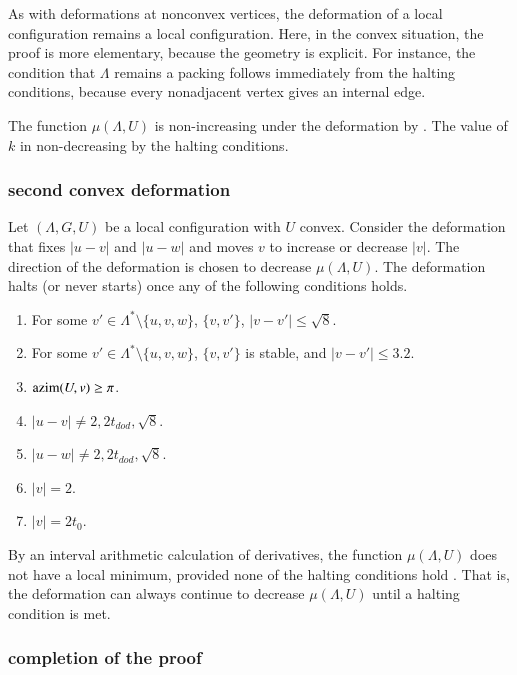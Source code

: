 \documentclass{article} %
\begin{document}
As with deformations at nonconvex vertices, 
the deformation of a local
configuration remains a local configuration.  Here, in the
convex situation, the proof is more elementary, because the
geometry is explicit.  For instance, the condition that
$\Lambda$ remains a packing follows immediately from the halting
conditions, because every nonadjacent vertex gives an internal
edge.

The function $\mu(\Lambda,U)$ is non-increasing under the
deformation by \cite[Lemma~7.8]{arx}.  The value of
$k$ in non-decreasing by the halting conditions. 

\subsubsection{second convex deformation}

Let $(\Lambda,G,U)$ be a local configuration with $U$ convex.
Consider the deformation that fixes $|u-v|$ and $|u-w|$ and
moves $v$ to increase or decrease $|v|$.  The direction
of the deformation is chosen to decrease $\mu(\Lambda,U)$.
The deformation halts (or never starts) once any
of the following conditions holds.
\begin{enumerate}\label{e:halt-convex2}
\item For some $v'\in\Lambda^*\setminus\{u,v,w\}$, 
$\{v,v'\}$, $|v-v'|\le \sqrt8$.
\item For some $v'\in\Lambda^*\setminus\{u,v,w\}$,
$\{v,v'\}$ is  stable, and $|v-v'|\le 3.2$.
\item ${\operatorname{azim}}(U,v)\ge\pi$.
\item $|u-v|\ne 2,2t_{dod},\sqrt8$.
\item $|u-w|\ne 2,2t_{dod},\sqrt8$.
\item $|v|=2$.
\item $|v|=2t_0$.
\end{enumerate}

By an interval arithmetic calculation of derivatives,
the function $\mu(\Lambda,U)$ does not have a local
minimum, provided none of the halting conditions hold
\cite[Lemma~7.10]{arx}.  That is, the deformation can always continue
to decrease $\mu(\Lambda,U)$ until a halting condition is met.



\subsubsection{completion of the proof}
\end{document}
